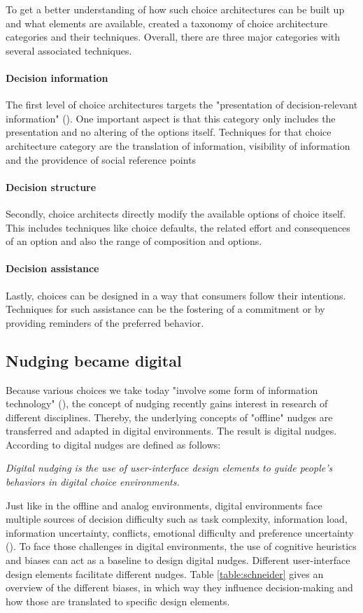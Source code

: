 To get a better understanding of how such choice architectures can be built up and what elements are available,  \cite{munscher_review_2016} created a taxonomy of choice architecture categories and their techniques. Overall, there are three major categories with several associated techniques. 
\paragraph{Decision information}
The first level of choice architectures targets the "presentation of decision-relevant information" (\cite{munscher_review_2016}). One important aspect is that this category only includes the presentation and no altering of the options itself. Techniques for that choice architecture category are the translation of information, visibility of information and the providence of social reference points
\paragraph{Decision structure}
Secondly, choice architects directly modify the available options of choice itself. This includes techniques like choice defaults, the related effort and consequences of an option and also the range of composition and options.
\paragraph{Decision assistance}
Lastly, choices can be designed in a way that consumers follow their intentions. Techniques for such assistance can be the fostering of a commitment or by providing reminders of the preferred behavior.

\subsection{Nudging became digital}
Because various choices we take today "involve some form of information technology" (\cite{johnson_beyond_2012}), the concept of nudging recently gains interest in research of different disciplines. Thereby, the underlying concepts of "offline" nudges are transferred and adapted in digital environments. The result is digital nudges. According to \cite{weinmann_digital_2016} digital nudges are defined as follows:
\begin{center}
\textit{Digital nudging is the use of user-interface design elements to guide people's behaviors in digital choice environments.}
\end{center}
Just like in the offline and analog environments, digital environments face multiple sources of decision difficulty such as task complexity, information load, information uncertainty, conflicts, emotional difficulty and preference uncertainty (\cite{broniarczyk_decision_2014}). To face those challenges in digital environments, the use of cognitive heuristics and biases can act as a baseline to design digital nudges. Different user-interface design elements facilitate different nudges. Table \ref{table:schneider} gives an overview of the different biases, in which way they influence decision-making and how those are translated to specific design elements.

